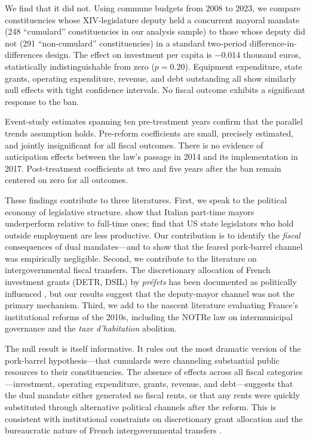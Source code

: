 \documentclass[12pt]{article}
\begin{document}
We find that it did not. Using commune budgets from 2008 to 2023, we compare constituencies whose XIV-legislature deputy held a concurrent mayoral mandate (248 ``cumulard'' constituencies in our analysis sample) to those whose deputy did not (291 ``non-cumulard'' constituencies) in a standard two-period difference-in-differences design. The effect on investment per capita is $-0.014$ thousand euros, statistically indistinguishable from zero ($p = 0.20$). Equipment expenditure, state grants, operating expenditure, revenue, and debt outstanding all show similarly null effects with tight confidence intervals. No fiscal outcome exhibits a significant response to the ban.

Event-study estimates spanning ten pre-treatment years confirm that the parallel trends assumption holds. Pre-reform coefficients are small, precisely estimated, and jointly insignificant for all fiscal outcomes. There is no evidence of anticipation effects between the law's passage in 2014 and its implementation in 2017. Post-treatment coefficients at two and five years after the ban remain centered on zero for all outcomes.

These findings contribute to three literatures. First, we speak to the political economy of legislative structure. \citet{gagliarducci2013manyfacespower} show that Italian part-time mayors underperform relative to full-time ones; \citet{fouirnaies2022legislators} find that US state legislators who hold outside employment are less productive. Our contribution is to identify the \textit{fiscal} consequences of dual mandates---and to show that the feared pork-barrel channel was empirically negligible. Second, we contribute to the literature on intergovernmental fiscal transfers. The discretionary allocation of French investment grants (DETR, DSIL) by \textit{préfets} has been documented as politically influenced \citep{enikolopov2014politics}, but our results suggest that the deputy-mayor channel was not the primary mechanism. Third, we add to the nascent literature evaluating France's institutional reforms of the 2010s, including the NOTRe law on intermunicipal governance \citep{breuille2018reform} and the \textit{taxe d'habitation} abolition.

The null result is itself informative. It rules out the most dramatic version of the pork-barrel hypothesis---that cumulards were channeling substantial public resources to their constituencies. The absence of effects across all fiscal categories---investment, operating expenditure, grants, revenue, and debt---suggests that the dual mandate either generated no fiscal rents, or that any rents were quickly substituted through alternative political channels after the reform. This is consistent with institutional constraints on discretionary grant allocation and the bureaucratic nature of French intergovernmental transfers \citep{enikolopov2014politics}.
\end{document}
